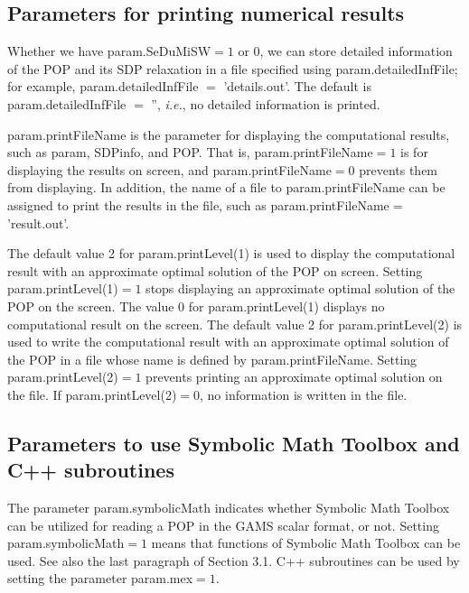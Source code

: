 \subsection{Parameters for printing numerical results}

Whether we have {\sf param.SeDuMiSW}$=1$ or $0$, we can store
detailed information of the POP and its SDP relaxation in a file specified using
 {\sf param.detailedInfFile}; for example,  {\sf param.detailedInfFile} $=$ 'details.out'.
The default is  {\sf param.detailedInfFile} $=$ '', {\it i.e.}, no detailed information is printed.

{\sf param.printFileName} is the parameter for displaying the computational results, %
such as {\sf param}, {\sf SDPinfo}, and {\sf POP}. That is, {\sf param.printFileName}$=1$
is for displaying the results  on screen, and {\sf param.printFileName}$=0$ prevents them
from displaying.
In addition,
the name of a file to {\sf param.printFileName}  can be  assigned to print the results in the file, such as
{\sf param.printFileName}$=$'result.out'.

The default value 2 for {\sf param.printLevel(1)} is used to display the computational result
with an approximate optimal solution of the POP on screen. Setting {\sf param.printLevel(1)}$=1$
 stops displaying an approximate optimal solution of the POP on the screen.
The value $0$ for {\sf param.printLevel(1)} displays no  computational result on the screen.
The default value 2 for {\sf param.printLevel(2)} is used to write the computational result with
an approximate optimal solution of the POP in a file whose name is defined by
{\sf param.printFileName}. Setting {\sf param.printLevel(2)}$=1$ prevents
printing an approximate optimal solution on the file.
If {\sf param.printLevel(2)}$=0$, no information is written in the file.

\subsection{Parameters to use Symbolic Math Toolbox and C++ subroutines}

The parameter {\sf param.symbolicMath} indicates whether
Symbolic Math Toolbox can be utilized for reading a POP in the GAMS scalar format, or not.
Setting {\sf param.symbolicMath}$=1$ means that functions of Symbolic Math Toolbox can
be used. See also the last paragraph of Section 3.1.  C++ subroutines can be used by
setting the parameter {\sf param.mex}$=1$.
